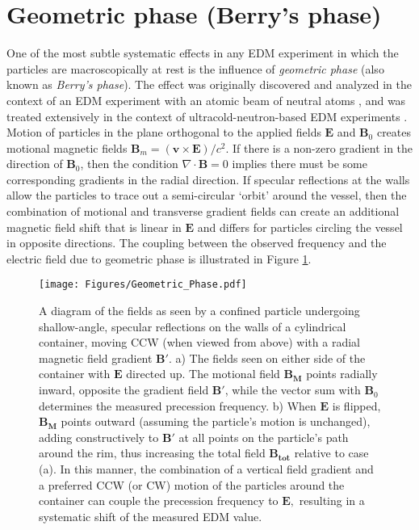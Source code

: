 \documentclass [10pt, twoside] {uwthesis}[2012/04/02]
\begin{document}
\section{Geometric phase (Berry's phase)}
One of the most subtle systematic effects in any EDM experiment in which the particles are macroscopically at rest is the influence of \textit{geometric phase} (also known as \textit{Berry's phase}). The effect was originally discovered and analyzed in the context of an EDM experiment with an atomic beam of neutral atoms \cite{1991_Commins_Geometric_Phase}, and was treated extensively in the context of ultracold-neutron-based EDM experiments \cite{2004_Geometric_Phase_ILL_nEDM}. Motion of particles in the plane orthogonal to the applied fields $\mathbf{E}$ and $\mathbf{B}_0$ creates motional magnetic fields $\mathbf{B}_m = (\mathbf{v}\times \mathbf{E})/c^2$. If there is a non-zero gradient in the direction of $\mathbf{B}_0$, then the condition $\nabla \cdot \mathbf{B} = 0$ implies there must be some corresponding gradients in the radial direction. If specular reflections at the walls allow the particles to trace out a semi-circular `orbit' around the vessel, then the combination of motional and transverse gradient fields can create an additional magnetic field shift that is linear in $\mathbf{E}$ and differs for particles circling the vessel in opposite directions. The coupling between the observed frequency and the electric field due to geometric phase is illustrated in Figure \ref{GeometricPhase}.
\begin{figure}
\begin{center}
\texttt{[image: Figures/Geometric\_Phase.pdf]}
\end{center}
\caption[Vector Diagram of Geometric Phase Shift]%
{\narrower A diagram of the fields as seen by a confined particle undergoing shallow-angle, specular reflections on the walls of a cylindrical container, moving CCW (when viewed from above) with a radial magnetic field gradient $\mathbf{B'}$. a) The fields seen on either side of the container with $\mathbf{E}$ directed up. The motional field $\mathbf{B_M}$ points radially inward, opposite the gradient field $\mathbf{B'}$, while the vector sum with $\mathbf{B}_0$ determines the measured precession frequency. b) When $\mathbf{E}$ is flipped, $\mathbf{B_M}$ points outward (assuming the particle's motion is unchanged), adding constructively to $\mathbf{B'}$ at all points on the particle's path around the rim, thus increasing the total field $\mathbf{B_{tot}}$ relative to case (a). In this manner, the combination of a vertical field gradient and a preferred CCW (or CW) motion of the particles around the container can couple the precession frequency to $\mathbf{E},$ resulting in a systematic shift of the measured EDM value.}
\label{GeometricPhase}
\end{figure}
\end{document}
